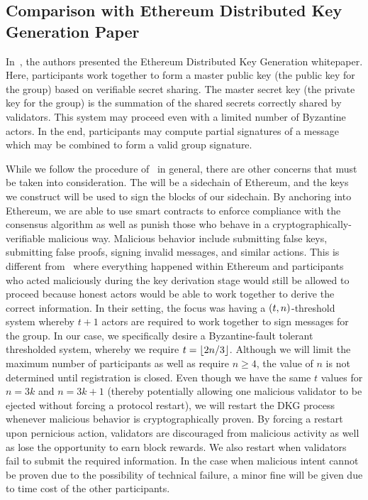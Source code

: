 \subsection{Comparison with Ethereum Distributed Key Generation Paper}
\label{ssec:ethdkg_comparison}

In~\cite{ethdkg}, the authors presented the Ethereum
Distributed Key Generation whitepaper.
Here, participants work together to form a master public key
(the public key for the group)
based on verifiable secret sharing.
The master secret key (the private key for the group)
is the summation of the shared secrets correctly shared by
validators.
This system may proceed even with a limited number of Byzantine actors.
In the end, participants may compute partial signatures of a message
which may be combined to form a valid group signature.

While we follow the procedure of~\cite{ethdkg} in general,
there are other concerns that must be taken into consideration.
The \LayerTwoLong{} will be a sidechain of Ethereum,
and the keys we construct will be used to sign the blocks of our sidechain.
By anchoring into Ethereum, we are able to use smart contracts to enforce
compliance with the consensus algorithm as well as punish
those who behave in a cryptographically-verifiable malicious way.
Malicious behavior include submitting false keys, submitting
false proofs, signing invalid messages, and similar actions.
This is different from~\cite{ethdkg} where everything
happened within Ethereum and participants who
acted maliciously during the key derivation stage would still
be allowed to proceed because honest actors would be able to
work together to derive the correct information.
In their setting, the focus was having a $\left( t,n \right)$-threshold
system whereby $t+1$ actors are required to work together to
sign messages for the group.
In our case, we specifically desire a Byzantine-fault tolerant
thresholded system, whereby we require $t = \left\lfloor 2n/3 \right\rfloor$.
Although we will limit the maximum number of participants
as well as require $n\ge4$, the value of $n$ is not determined
until registration is closed.
Even though we have the same $t$ values for $n = 3k$ and $n = 3k+1$
(thereby potentially allowing one malicious validator to be
ejected without forcing a protocol restart),
we will restart the DKG process whenever malicious behavior
is cryptographically proven.
By forcing a restart upon pernicious action,
validators are discouraged from malicious activity as well
as lose the opportunity to earn block rewards.
We also restart when validators fail to submit the required
information.
In the case when malicious intent cannot be proven due to
the possibility of technical failure, a minor fine will be
given due to time cost of the other participants.


